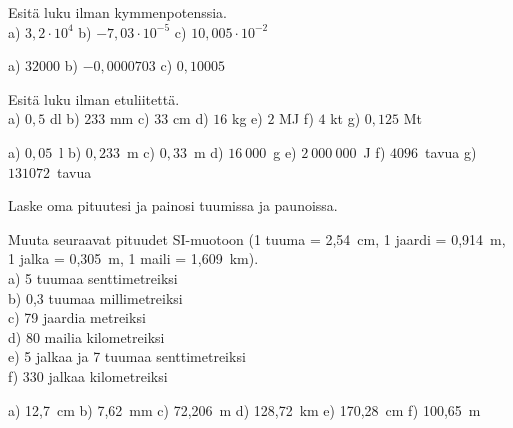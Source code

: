 
\begin{tehtava}
Esitä luku ilman kymmenpotenssia. \\
a) $3,2 \cdot 10^4$ \qquad
b) $-7,03 \cdot 10^{-5}$ \qquad
c) $10,005 \cdot 10^{-2}$ \qquad
\begin{vastaus}
a) $32000$ \qquad
b) $-0,0000703$ \qquad
c) $0,10005$ \qquad
\end{vastaus}
\end{tehtava}


\begin{tehtava}
Esitä luku ilman etuliitettä. \\
a) $0,5$ dl \qquad
b) $233$ mm \qquad
c) $33$ cm \qquad
d) $16$ kg \qquad
e) $2$ MJ \qquad
f) $4$ kt \qquad
g) $0,125$ Mt
\begin{vastaus}
a) $0,05$~l \qquad
b) $0,233$~m \qquad
c) $0,33$~m \qquad
d) $16~000$~g \qquad
e) $2~000~000$~J \qquad
f) $4096$~tavua \qquad
g) $131072$~tavua
\end{vastaus}
\end{tehtava}

\begin{tehtava}
Laske oma pituutesi ja painosi tuumissa ja paunoissa.
\end{tehtava}

\begin{tehtava}
Muuta seuraavat pituudet SI-muotoon (1 tuuma = 2,54~cm, 1 jaardi = 0,914~m, 1 jalka = 0,305~m, 1 maili = 1,609~km). \\
a) 5 tuumaa senttimetreiksi \\
b) 0,3 tuumaa millimetreiksi \\
c) 79 jaardia metreiksi \\
d) 80 mailia kilometreiksi \\
e) 5 jalkaa ja 7 tuumaa senttimetreiksi \\
f) 330 jalkaa kilometreiksi
\begin{vastaus}
a) 12,7~cm \qquad
b) 7,62~mm \qquad
c) 72,206~m \qquad
d) 128,72~km \qquad
e) 170,28~cm \qquad
f) 100,65~m
\end{vastaus}
\end{tehtava}

